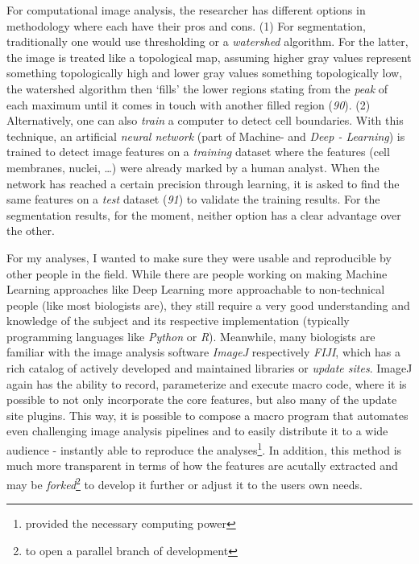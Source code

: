 \documentclass[11pt,singlespacinge,twoside]{reedthesis} %
\theoremstyle{definition}
\theoremstyle{definition}
\theoremstyle{definition}
\theoremstyle{remark}
\begin{document}
For computational image analysis, the researcher has different options in methodology where each have their pros and cons. (1) For segmentation, traditionally one would use thresholding or a \emph{watershed} algorithm. For the latter, the image is treated like a topological map, assuming higher gray values represent something topologically high and lower gray values something topologically low, the watershed algorithm then `fills' the lower regions stating from the \emph{peak} of each maximum until it comes in touch with another filled region (\emph{90}). (2) Alternatively, one can also \emph{train} a computer to detect cell boundaries. With this technique, an artificial \emph{neural network} (part of Machine- and \emph{Deep - Learning}) is trained to detect image features on a \emph{training} dataset where the features (cell membranes, nuclei, \ldots) were already marked by a human analyst. When the network has reached a certain precision through learning, it is asked to find the same features on a \emph{test} dataset (\emph{91}) to validate the training results. For the segmentation results, for the moment, neither option has a clear advantage over the other.

For my analyses, I wanted to make sure they were usable and reproducible by other people in the field. While there are people working on making Machine Learning approaches like Deep Learning more approachable to non-technical people (like most biologists are), they still require a very good understanding and knowledge of the subject and its respective implementation (typically programming languages like \emph{Python} or \emph{R}). Meanwhile, many biologists are familiar with the image analysis software \emph{ImageJ} respectively \emph{FIJI}, which has a rich catalog of actively developed and maintained libraries or \emph{update sites}. ImageJ again has the ability to record, parameterize and execute macro code, where it is possible to not only incorporate the core features, but also many of the update site plugins. This way, it is possible to compose a macro program that automates even challenging image analysis pipelines and to easily distribute it to a wide audience - instantly able to reproduce the analyses\footnote{provided the necessary computing power}. In addition, this method is much more transparent in terms of how the features are acutally extracted and may be \emph{forked}\footnote{to open a parallel branch of development} to develop it further or adjust it to the users own needs.
\end{document}
